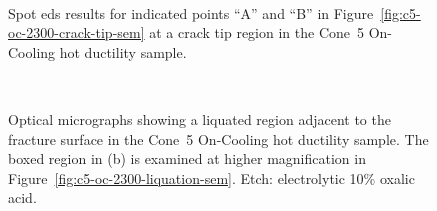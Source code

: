 {\begin{figure}
    \centering
     \\
    \caption{Spot \gls{eds} results for indicated points ``A'' and ``B'' in Figure~\ref{fig:c5-oc-2300-crack-tip-sem} at a crack tip region in the Cone~5 On-Cooling \protect{} hot ductility sample.}
    \label{fig:c5-oc-2300-crack-tip-eds}
\end{figure}


\begin{figure}
    \centering
     \\
    \caption{Optical micrographs showing a liquated region adjacent to the fracture surface in the Cone~5 On-Cooling \protect{} hot ductility sample. The boxed region in (b) is examined at higher magnification in Figure~\ref{fig:c5-oc-2300-liquation-sem}. Etch: electrolytic 10\% oxalic acid.}
    \label{fig:c5-oc-2300-liquation-olm}
\end{figure}

}
